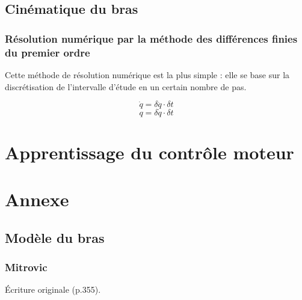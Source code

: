 \documentclass[pdftex,a4paper,11pt]{report}
\numberwithin{equation}{subsection}
\begin{document}

\section{Cinématique du bras}

\subsection{Résolution numérique par la méthode des différences finies du premier ordre}

Cette méthode de résolution numérique est la plus simple : elle se base sur la discrétisation de l'intervalle d'étude en un certain nombre de pas.

\[\dot{q} = \delta \ddot{q} \cdot \delta t\]
\[q = \delta \dot{q} \cdot \delta t\]


\chapter{Apprentissage du contrôle moteur}


\chapter{Annexe}

\section{Modèle du bras}


\subsection{Mitrovic}
Écriture originale \cite{katayama1993} (p.355).
\end{document}
